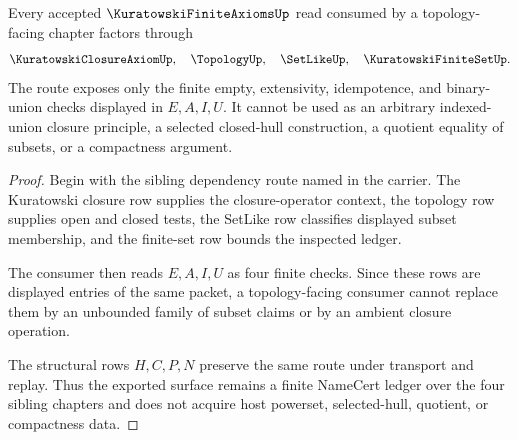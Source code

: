 \begin{theorem}
\label{thm:kuratowski-finite-axioms-topology-route}
Every accepted $\KuratowskiFiniteAxiomsUp$ read consumed by a topology-facing chapter factors through
$$
\KuratowskiClosureAxiomUp,\quad \TopologyUp,\quad \SetLikeUp,\quad \KuratowskiFiniteSetUp .
$$
The route exposes only the finite empty, extensivity, idempotence, and binary-union checks displayed in $E,A,I,U$. It cannot be used as an arbitrary indexed-union closure principle, a selected closed-hull construction, a quotient equality of subsets, or a compactness argument.
\end{theorem}
\begin{proof}
Begin with the sibling dependency route named in the carrier. The Kuratowski closure row supplies the closure-operator context, the topology row supplies open and closed tests, the SetLike row classifies displayed subset membership, and the finite-set row bounds the inspected ledger.

The consumer then reads $E,A,I,U$ as four finite checks. Since these rows are displayed entries of the same packet, a topology-facing consumer cannot replace them by an unbounded family of subset claims or by an ambient closure operation.

The structural rows $H,C,P,N$ preserve the same route under transport and replay. Thus the exported surface remains a finite NameCert ledger over the four sibling chapters and does not acquire host powerset, selected-hull, quotient, or compactness data.
\end{proof}


\begin{closurestatus}{\KuratowskiFiniteAxiomsUp}
  \theoryclosure{\seedClosure}
  \formalstatus{\unformalizedV}
\end{closurestatus}

